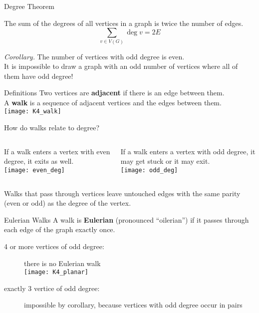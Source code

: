 \documentclass{beamer}
\begin{document}
\begin{frame}{Degree Theorem}
\begin{theorem} The sum of the degrees of all vertices in a graph is twice the number of edges.
$$ \sum_{v \in V(G)} \deg{v} = 2E$$
\end{theorem}
\textit{Corollary.} The number of vertices with odd degree is even.\medskip\\
It is impossible to draw a graph with an odd number of vertices where all of them have odd degree!
\end{frame}
\begin{frame}{Definitions}
Two vertices are \textbf{adjacent} if there is an edge between them.\\
A \textbf{walk} is a sequence of adjacent vertices and the edges between them.\vspace*{.5cm}\\
{\centering \texttt{[image: K4\_walk]}}
\end{frame}
\begin{frame}
How do walks relate to degree?\vspace{.5cm}
\begin{columns}
\begin{column}{.5\textwidth}
If a walk enters a vertex with even degree, it exits as well.\vspace*{.2cm}\\
\texttt{[image: even\_deg]}
\end{column}
\begin{column}{.5\textwidth}
If a walk enters a vertex with odd degree, it may get stuck or it may exit.\vspace*{.2cm}\\
\texttt{[image: odd\_deg]}
\end{column}
\end{columns}\vspace*{.2cm}
Walks that pass through vertices leave untouched edges with the same parity (even or odd) as the degree of the vertex.
\end{frame}
\begin{frame}{Eulerian Walks} A walk is \textbf{Eulerian} (pronounced ``oilerian'') if it passes through each edge of the graph exactly once.
\begin{description}
\item[4 or more vertices of odd degree:] there is no Eulerian walk\\
\texttt{[image: K4\_planar]}
\item[exactly 3 vertice of odd degree:] impossible by corollary, because vertices with odd degree occur in pairs

\end{description}
\end{frame}
\end{document}
